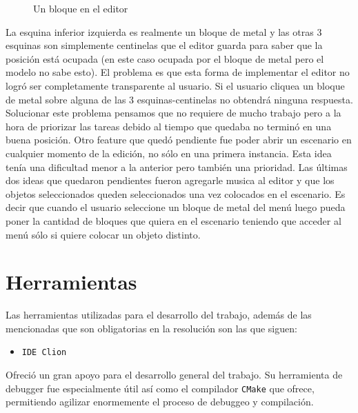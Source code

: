 \documentclass[a4paper]{article}
\begin{document}
\begin{figure}[!h]
	\caption{Un bloque en el editor}
	\label{fig:diagrama1}
\end{figure}

La esquina inferior izquierda es realmente un bloque de metal y las otras 3 esquinas son simplemente centinelas que el editor guarda para saber que la posición está ocupada (en este caso ocupada por el bloque de metal pero el modelo no sabe esto). El problema es que esta forma de implementar el editor no logró ser completamente transparente al usuario. Si el usuario cliquea un bloque de metal sobre alguna de las 3 esquinas-centinelas no obtendrá ninguna respuesta. Solucionar este problema pensamos que no requiere de mucho trabajo pero a la hora de priorizar las tareas debido al tiempo que quedaba no terminó en una buena posición. 
Otro feature que quedó pendiente fue poder abrir un escenario en cualquier momento de la edición, no sólo en una primera instancia. Esta idea tenía una dificultad menor a la anterior pero también una prioridad.
Las últimas dos ideas que quedaron pendientes fueron agregarle musica al editor y que los objetos seleccionados queden seleccionados una vez colocados en el escenario. Es decir que cuando el usuario seleccione un bloque de metal del menú luego pueda poner la cantidad de bloques que quiera en el escenario teniendo que acceder al menú sólo si quiere colocar un objeto distinto.

\section{Herramientas}

Las herramientas utilizadas para el desarrollo del trabajo, además de las mencionadas que son obligatorias en la resolución son las que siguen:

\begin{itemize}
	\item \texttt{IDE Clion}
\end{itemize}

Ofreció un gran apoyo para el desarrollo general del trabajo. Su herramienta de debugger fue especialmente útil así como el compilador \texttt{CMake} que ofrece, permitiendo agilizar enormemente el proceso de debuggeo y compilación.
\end{document}
